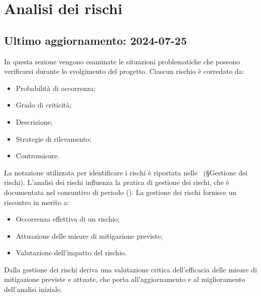 \section{Analisi dei rischi}
\label{sec:analisi_rischi}

\subsection{Ultimo aggiornamento: 2024-07-25}

\par In questa sezione vengono esaminate le situazioni problematiche che possono verificarsi durante lo svolgimento del progetto. Ciascun rischio è corredato da:
\begin{itemize}
  \item Probabilità di occorrenza;
  \item Grado di criticità;
  \item Descrizione;
  \item Strategie di rilevamento;
  \item Contromisure.
\end{itemize}

\vspace{0.5\baselineskip}
\par La notazione utilizzata per identificare i rischi è riportata nelle \NormeDiProgetto\ (§Gestione dei rischi). L'analisi dei rischi influenza la pratica di gestione dei rischi, che è documentata nel consuntivo di periodo (). La gestione dei rischi fornisce un riscontro in merito a:
\begin{itemize}
  \item Occorrenza effettiva di un rischio;
  \item Attuazione delle misure di mitigazione previste;
  \item Valutazione dell'impatto del rischio. 
\end{itemize}

\vspace{0.5\baselineskip}
\par Dalla gestione dei rischi deriva una valutazione critica dell’efficacia delle misure di mitigazione previste e attuate, che porta all’aggiornamento e al miglioramento dell’analisi iniziale.



